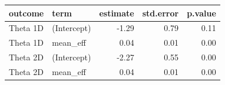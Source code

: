 \begin{tabular}{llrrr}
  \toprule
outcome & term & estimate & std.error & p.value \\ 
  \midrule
Theta 1D & (Intercept) & -1.29 & 0.79 & 0.11 \\ 
  Theta 1D & mean\_eff & 0.04 & 0.01 & 0.00 \\ 
  Theta 2D & (Intercept) & -2.27 & 0.55 & 0.00 \\ 
  Theta 2D & mean\_eff & 0.04 & 0.01 & 0.00 \\ 
   \bottomrule
\end{tabular}
